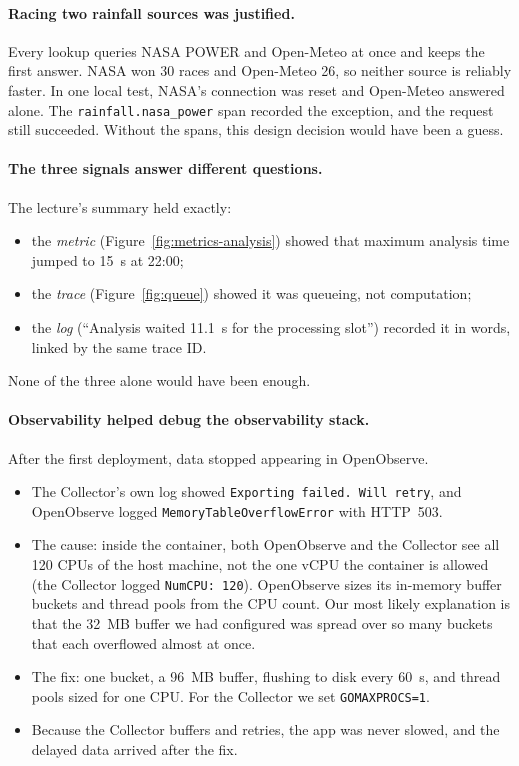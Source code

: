 \documentclass[manuscript,screen]{acmart}
\begin{document}
\paragraph{Racing two rainfall sources was justified.} Every lookup queries
NASA POWER and Open-Meteo at once and keeps the first answer. NASA won 30
races and Open-Meteo 26, so neither source is reliably faster. In one local
test, NASA's connection was reset and Open-Meteo answered alone. The
\texttt{rainfall.nasa\_power} span recorded the exception, and the request
still succeeded. Without the spans, this design decision would have been a
guess.

\paragraph{The three signals answer different questions.} The lecture's
summary held exactly:
\begin{itemize}
\item the \emph{metric} (Figure~\ref{fig:metrics-analysis}) showed that
  maximum analysis time jumped to 15~s at 22:00;
\item the \emph{trace} (Figure~\ref{fig:queue}) showed it was queueing, not
  computation;
\item the \emph{log} (``Analysis waited 11.1~s for the processing slot'')
  recorded it in words, linked by the same trace ID.
\end{itemize}
None of the three alone would have been enough.

\paragraph{Observability helped debug the observability stack.} After the
first deployment, data stopped appearing in OpenObserve.
\begin{itemize}
\item The Collector's own log showed \texttt{Exporting failed. Will retry},
  and OpenObserve logged \texttt{MemoryTableOverflowError} with HTTP~503.
\item The cause: inside the container, both OpenObserve and the Collector
  see all 120 CPUs of the host machine, not the one vCPU the container is
  allowed (the Collector logged \texttt{NumCPU: 120}). OpenObserve sizes its
  in-memory buffer buckets and thread pools from the CPU count. Our most
  likely explanation is that the 32~MB buffer we had configured was spread
  over so many buckets that each overflowed almost at once.
\item The fix: one bucket, a 96~MB buffer, flushing to disk every 60~s,
  and thread pools sized for one CPU. For the Collector we set
  \texttt{GOMAXPROCS=1}.
\item Because the Collector buffers and retries, the app was never
  slowed, and the delayed data arrived after the fix.
\end{itemize}
\end{document}
